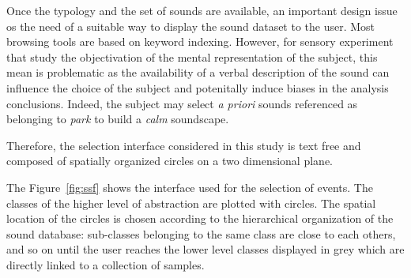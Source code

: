 \documentclass[twoside,twocolumn]{article}
\begin{document}


Once the typology and the set of sounds are available, an important design issue os the need of a suitable way to display the sound dataset to the user. Most browsing tools are based on keyword indexing. However, for sensory experiment that study the objectivation of the mental representation of the subject, this mean is problematic as the availability of a verbal description of the sound can influence the choice of the subject and potenitally induce biases in the analysis conclusions. Indeed, the subject may select \textit{a priori} sounds referenced as belonging to \emph{park} to build a \emph{calm} soundscape.


Therefore, the selection interface considered in this study is text free and composed of spatially organized circles on a two dimensional plane.


The Figure~\ref{fig:ssf} shows the interface used for the selection of events. The classes of the higher level of abstraction are plotted with circles. The spatial location of the circles is chosen according to the hierarchical organization of the sound database: sub-classes belonging to the same class are close to each others, and so on until the user reaches the lower level classes displayed in grey which are directly linked to a collection of samples.
\end{document}
